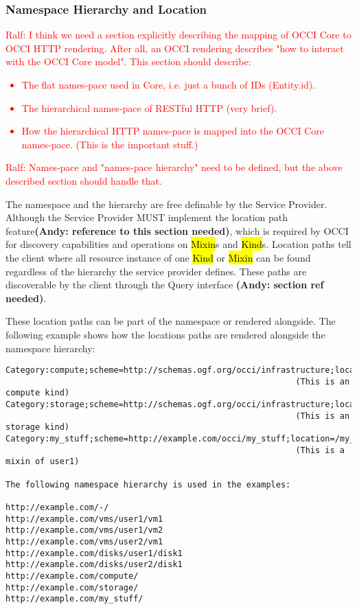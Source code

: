 \documentclass[10pt,a4paper]{article}
\newcommand{\ralf}[1]{\textcolor{red}{Ralf: #1}}
\begin{document}
\subsubsection{Namespace Hierarchy and Location}

\ralf{I think we need a section explicitly describing the mapping of OCCI Core
to OCCI HTTP rendering.  After all, an OCCI rendering describes "how to
interact with the OCCI Core model". This section should describe:
\begin{itemize}
\item The flat names-pace used in Core, i.e. just a bunch of IDs (Entity.id).
\item The hierarchical names-pace of RESTful HTTP (very brief).
\item How the hierarchical HTTP names-pace is mapped into the OCCI Core
names-pace.  (This is the important stuff.)
\end{itemize}
}

\ralf{Names-pace and "names-pace hierarchy" need to be defined, but the above
described section should handle that.}

The namespace and the hierarchy are free definable by the Service
Provider. Although the Service Provider MUST implement the location
path feature\textbf{(Andy: reference to this section needed)}, 
which is required by OCCI for discovery capabilities and
operations on \hl{Mixin}s and \hl{Kind}s. Location paths tell the
client where all resource instance of one \hl{Kind} or \hl{Mixin} can
be found regardless of the hierarchy the service provider
defines. These paths are discoverable by the client through the Query
interface \textbf{(Andy: section ref needed)}.

These location paths can be part of the namespace or rendered
alongside. The following example shows how the locations paths are
rendered alongside the namespace hierarchy:

\begin{verbatim}
Category:compute;scheme=http://schemas.ogf.org/occi/infrastructure;location=/compute 
                                                           (This is an compute kind)
Category:storage;scheme=http://schemas.ogf.org/occi/infrastructure;location=/storage 
                                                           (This is an storage kind)
Category:my_stuff;scheme=http://example.com/occi/my_stuff;location=/my_stuff 
                                                           (This is a mixin of user1)

The following namespace hierarchy is used in the examples:

http://example.com/-/
http://example.com/vms/user1/vm1
http://example.com/vms/user1/vm2
http://example.com/vms/user2/vm1
http://example.com/disks/user1/disk1
http://example.com/disks/user2/disk1
http://example.com/compute/
http://example.com/storage/
http://example.com/my_stuff/
\end{verbatim}
\end{document}
